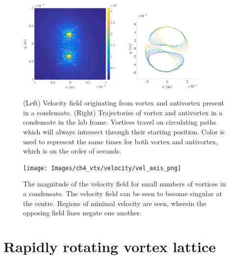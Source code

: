 \begin{figure}\centering
    \includegraphics[width=0.45\textwidth]{Images/ch4_vtx/velocity/vtx_antivtx_vel}
    \includegraphics[width=0.45\textwidth]{Images/ch4_vtx/vtx_antivtx_traj}
    \caption{(Left) Velocity field originating from vortex and antivortex present in a condensate. (Right) Trajectories of vortex and antivortex in a condensate in the lab frame. Vortices travel on circulating paths which will always intersect through their starting position. Color is used to represent the same times for both vortex and antivortex, which is on the order of seconds.}
    \label{fig:vel_pm}
\end{figure}

\begin{figure}\centering
    \texttt{[image: Images/ch4\_vtx/velocity/vel\_axis\_png]}
    \caption{The magnitude of the velocity field for small numbers of vortices in a condensate. The velocity field can be seen to become singular at the centre. Regions of minimal velocity are seen, wherein the opposing field lines negate one another.}
    \label{fig:vel_pm_contour}
\end{figure}


\section{Rapidly rotating vortex lattice}

